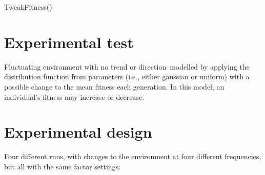 \begin{function}
	\caption{TweakFitness()}
\end{function}

\section{Experimental test}\label{experimental-test}

Fluctuating environment with no trend or direction--modelled by applying the distribution function from parameters (i.e., either gaussian or uniform) with a possible change to the mean fitness each generation. In this model, an individual's fitness may increase or decrease.

\section{Experimental design}\label{experimental-design-8}

Four different runs, with changes to the environment at four different frequencies, but all with the same factor settings:



